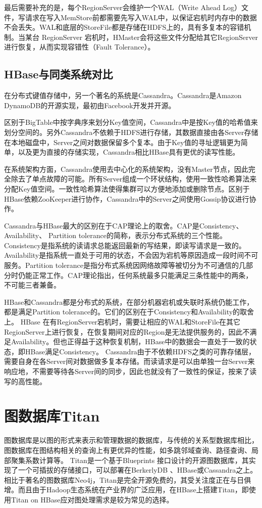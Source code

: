 最后需要补充的是，每个RegionServer会维护一个WAL（Write Ahead Log）文件，写请求在写入MemStore前都需要先写入WAL中，以保证宕机时内存中的数据不会丢失。WAL和底层的StoreFile都是存储在HDFS上的，具有多复本的容错机制。当某台 RegionServer 宕机时，HMaster会将这些文件分配给其它RegionServer进行恢复，从而实现容错性（Fault Tolerance）。

\subsection{HBase与同类系统对比}
在分布式键值存储中，另一个著名的系统是Cassandra\supercite{cassandra}。Cassandra是Amazon DynamoDB\supercite{DynamoDB}的开源实现，最初由Facebook开发并开源。

区别于BigTable中按字典序来划分Key值空间，Cassandra中是按Key值的哈希值来划分空间的。另外Cassandra不依赖于HDFS进行存储，其数据直接由各Server存储在本地磁盘中，Server之间对数据保留多个复本。由于Key值的寻址逻辑更为简单，以及更为直接的存储实现，Cassandra相比HBase具有更优的读写性能。

在系统架构方面，Cassandra使用去中心化的系统架构，没有Master节点，因此完全除去了单点故障的可能。所有Server组成一个环状结构，使用一致性哈希算法来分配Key值空间。一致性哈希算法使得集群可以方便地添加或删除节点。区别于HBase依赖ZooKeeper进行协作，Cassandra中的Server之间使用Gossip协议进行协作。

Cassandra与HBase最大的区别在于CAP\supercite{CAP}理论上的取舍。CAP是Consistency、 Availability、 Partition tolerance的简称，表示分布式系统的三个性能。Consistency是指系统的读请求总能返回最新的写结果，即读写请求是一致的。Availability是指系统一直处于可用的状态，不会因为宕机等原因造成一段时间不可服务。Partition tolerance是指分布式系统因网络故障等被切分为不可通信的几部分时仍能正常工作。CAP理论指出，任何系统最多只能满足三条性能中的两条，不可能三者兼备。

HBase和Cassandra都是分布式的系统，在部分机器宕机或失联时系统仍能工作，都是满足Partition tolerance的。它们的区别在于Consistency和Availability的取舍上。
HBase 在有RegionServer宕机时，需要让相应的WAL和StoreFile在其它RegionServer上进行恢复，在恢复期间对应的Region是无法提供服务的，因此不满足Availability。但也正得益于这种恢复机制，HBase中的数据会一直处于一致的状态，即HBase满足Consistency。
Cassandra由于不依赖HDFS之类的可靠存储层，需要自身在各Server间对数据做多复本存储。而读请求是可以由单独一台Server来响应地，不需要等待各Server间的同步，因此也就没有了一致性的保证，按来了读写的高性能。

\section{图数据库Titan}
图数据库是以图的形式来表示和管理数据的数据库\supercite{graph_models_survey}，与传统的关系型数据库相比，图数据库在图结构相关的查询上有更优异的性能，如多跳邻域查询、路径查询、局部聚集系数计算等。
Titan是一个基于Blueprints 接口设计的开源图数据库，其实现了一个可插拔的存储接口，可以部署在BerkerlyDB 、HBase或Cassandra之上。相比于著名的图数据库Neo4j，Titan是完全开源免费的，其受关注度正在与日俱增。而且由于Hadoop生态系统在产业界的广泛应用，在HBase上搭建Titan，即使用Titan on HBase应对图处理需求是较为常见的选择。

